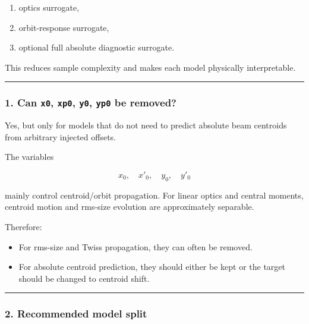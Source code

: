 \documentclass[
]{article}
\providecommand{\tightlist}{%
  \setlength{\itemsep}{0pt}\setlength{\parskip}{0pt}}
\begin{document}
\begin{enumerate}
\def\labelenumi{\arabic{enumi}.}
\tightlist
\item
  optics surrogate,
\item
  orbit-response surrogate,
\item
  optional full absolute diagnostic surrogate.
\end{enumerate}

This reduces sample complexity and makes each model physically
interpretable.

\begin{center}\rule{0.5\linewidth}{0.5pt}\end{center}

\hypertarget{can-x0-xp0-y0-yp0-be-removed}{%
\subsubsection{\texorpdfstring{1. Can \texttt{x0}, \texttt{xp0},
\texttt{y0}, \texttt{yp0} be
removed?}{1. Can x0, xp0, y0, yp0 be removed?}}\label{can-x0-xp0-y0-yp0-be-removed}}

Yes, but only for models that do not need to predict absolute beam
centroids from arbitrary injected offsets.

The variables

\[
x_0,\quad x'_0,\quad y_0,\quad y'_0
\]

mainly control centroid/orbit propagation. For linear optics and central
moments, centroid motion and rms-size evolution are approximately
separable.

Therefore:

\begin{itemize}
\tightlist
\item
  For rms-size and Twiss propagation, they can often be removed.
\item
  For absolute centroid prediction, they should either be kept or the
  target should be changed to centroid shift.
\end{itemize}

\begin{center}\rule{0.5\linewidth}{0.5pt}\end{center}

\hypertarget{recommended-model-split}{%
\subsubsection{2. Recommended model
split}\label{recommended-model-split}}
\end{document}
